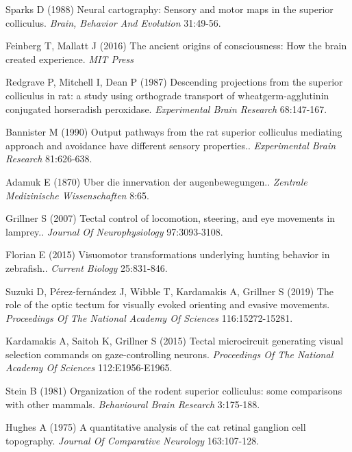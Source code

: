 \documentclass{ar-1col}
\begin{document}
{\begin{thebibliography}{00}
Sparks D (1988) 
Neural cartography: Sensory and motor maps in the superior colliculus.
\textit{ Brain, Behavior And Evolution} 31:49-56.

Feinberg T, Mallatt J (2016) 
The ancient origins of consciousness: How the brain created experience.
\textit{ MIT Press}

Redgrave P, Mitchell I, Dean P (1987) 
Descending projections from the superior colliculus in rat: a study using orthograde transport of wheatgerm-agglutinin conjugated horseradish peroxidase.
\textit{ Experimental Brain Research} 68:147-167.

Bannister M (1990) 
Output pathways from the rat superior colliculus mediating approach and avoidance have different sensory properties..
\textit{ Experimental Brain Research} 81:626-638.

Adamuk E (1870) 
Uber die innervation der augenbewegungen..
\textit{ Zentrale Medizinische Wissenschaften} 8:65.

Grillner S (2007) 
Tectal control of locomotion, steering, and eye movements in lamprey..
\textit{ Journal Of Neurophysiology} 97:3093-3108.

Florian E (2015) 
Visuomotor transformations underlying hunting behavior in zebrafish..
\textit{ Current Biology} 25:831-846.

Suzuki D, P{\'e}rez-fern{\'a}ndez J, Wibble T, Kardamakis A, Grillner S (2019) 
The role of the optic tectum for visually evoked orienting and evasive movements.
\textit{ Proceedings Of The National Academy Of Sciences} 116:15272-15281.

Kardamakis A, Saitoh K, Grillner S (2015) 
Tectal microcircuit generating visual selection commands on gaze-controlling neurons.
\textit{ Proceedings Of The National Academy Of Sciences} 112:E1956-E1965.

Stein B (1981) 
Organization of the rodent superior colliculus: some comparisons with other mammals.
\textit{ Behavioural Brain Research} 3:175-188.

Hughes A (1975) 
A quantitative analysis of the cat retinal ganglion cell topography.
\textit{ Journal Of Comparative Neurology} 163:107-128.


\end{thebibliography}}
\end{document}
